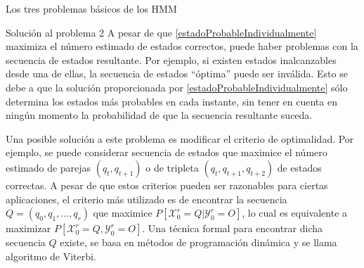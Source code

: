 \begin{section}{Los tres problemas básicos de los HMM}
\begin{subsection}{Solución al problema 2}
A pesar de que \ref{estadoProbableIndividualmente} maximiza el número estimado de estados correctos, puede haber problemas con la secuencia de estados resultante. Por ejemplo, si existen estados inalcanzables desde una de ellas, la secuencia de estados \enquote{óptima} puede ser inválida. Esto se debe a que la solución proporcionada por \ref{estadoProbableIndividualmente} sólo determina los estados más probables en cada instante, sin tener en cuenta en ningún momento la probabilidad de que la secuencia resultante suceda. 

Una posible solución a este problema es modificar el criterio de optimalidad. Por ejemplo, se puede considerar secuencia de estados que maximice el número estimado de parejas $(q_t,q_{t+1})$ o de tripleta $(q_t,q_{t+1},q_{t+2})$ de estados correctas. A pesar de que estos criterios pueden ser razonables para ciertas aplicaciones, el criterio más utilizado es de encontrar la secuencia $Q=(q_0, q_1, \dots, q_r)$ que maximice $P[\mathcal{X}_0^r=Q|\mathcal{Y}_0^r=O]$, lo cual es equivalente a maximizar $P[\mathcal{X}_0^r=Q,\mathcal{Y}_0^r=O]$. Una técnica formal para encontrar dicha secuencia $Q$ existe, se basa en métodos de programación dinámica y se llama algoritmo de Viterbi.




\end{subsection}

\end{section}